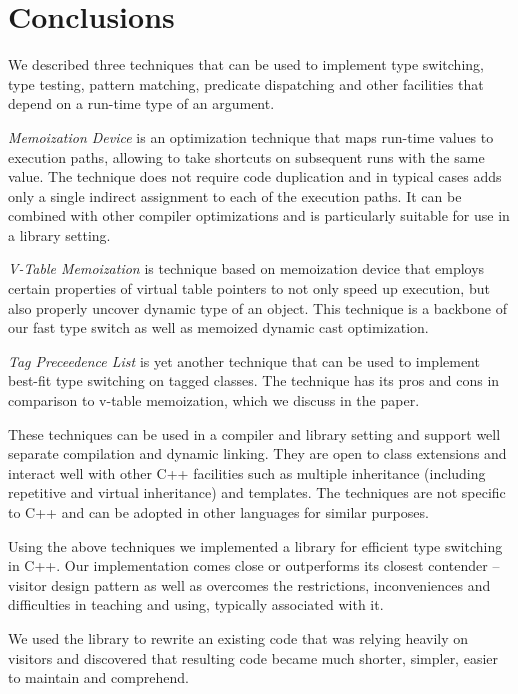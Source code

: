 \documentclass[preprint]{sigplanconf}
\begin{document}
\section{Conclusions} %
\label{sec:cc}

We described three techniques that can be used to implement type switching, type 
testing, pattern matching, predicate dispatching and other facilities that 
depend on a run-time type of an argument.

\emph{Memoization Device} is an optimization technique that maps run-time values 
to execution paths, allowing to take shortcuts on subsequent runs with the same 
value. The technique does not require code duplication and in typical cases adds 
only a single indirect assignment to each of the execution paths. It can be 
combined with other compiler optimizations and is particularly suitable for use 
in a library setting.

\emph{V-Table Memoization} is technique based on memoization device that employs 
certain properties of virtual table pointers to not only speed up execution, but 
also properly uncover dynamic type of an object. This technique is a backbone of 
our fast type switch as well as memoized dynamic cast optimization.

\emph{Tag Preceedence List} is yet another technique that can be used to 
implement best-fit type switching on tagged classes. The technique has its pros 
and cons in comparison to v-table memoization, which we discuss in the paper.

These techniques can be used in a compiler and library setting and support well 
separate compilation and dynamic linking. They are open to class extensions and 
interact well with other C++ facilities such as multiple inheritance (including 
repetitive and virtual inheritance) and templates. The techniques are not 
specific to C++ and can be adopted in other languages for similar purposes.

Using the above techniques we implemented a library for efficient type switching 
in C++. Our implementation comes close or outperforms its closest contender -- 
visitor design pattern as well as overcomes the restrictions, inconveniences and 
difficulties in teaching and using, typically associated with it.

We used the library to rewrite an existing code that was relying heavily on 
visitors and discovered that resulting code became much shorter, simpler, easier 
to maintain and comprehend.
\end{document}
